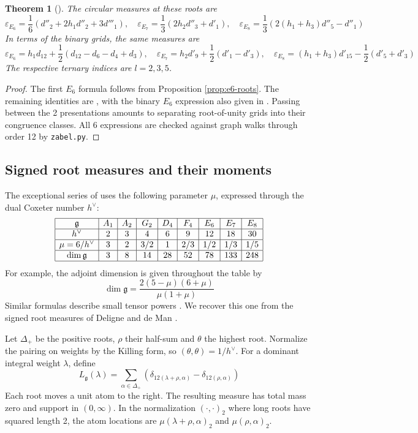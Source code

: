 \documentclass[11pt,reqno]{amsart}
\newtheorem{thm}{Theorem}[section]
\theoremstyle{definition}
\numberwithin{equation}{section}
\begin{document}
\begin{thm}[\cite{Ban09}]\label{thm:egrids}
The circular measures at these roots are
$$\varepsilon_{E_6}=\frac16(d''_2+2h_1d''_2+3d'''_1),\quad \varepsilon_{E_7}=\frac13(2h_2d''_3+d'_1),\quad \varepsilon_{E_8}=\frac13(2(h_1+h_3)d''_5-d''_1)$$
In terms of the binary grids, the same measures are
$$\varepsilon_{E_6}=h_1d_{12}+\frac12(d_{12}-d_6-d_4+d_3),\quad \varepsilon_{E_7}=h_2d'_9+\frac12(d'_1-d'_3),\quad \varepsilon_{E_8}=(h_1+h_3)d'_{15}-\frac12(d'_5+d'_3)$$
The respective ternary indices are $l=2,3,5$.
\end{thm}
\begin{proof}
The first $E_6$ formula follows from Proposition \ref{prop:e6-roots}. The remaining identities are \cite[Theorems 7.1 and 8.7]{Ban09}, with the binary $E_6$ expression also given in \cite[Theorem 6.2]{BB07}. Passing between the 2 presentations amounts to separating root-of-unity grids into their congruence classes. All 6 expressions are checked against graph walks through order 12 by \texttt{zabel.py}.
\end{proof}

\subsection{Signed root measures and their moments}

The exceptional series of \cite{Del96} uses the following parameter $\mu$, expressed through the dual Coxeter number $h^\vee$:
$$\begin{array}{|c|c|c|c|c|c|c|c|c|}\hline
\mathfrak g&A_1&A_2&G_2&D_4&F_4&E_6&E_7&E_8\\\hline
h^\vee&2&3&4&6&9&12&18&30\\\hline
\mu=6/h^\vee&3&2&3/2&1&2/3&1/2&1/3&1/5\\\hline
\dim\mathfrak g&3&8&14&28&52&78&133&248\\\hline
\end{array}$$
For example, the adjoint dimension is given throughout the table by
\begin{equation}\label{eq:deligne-dim}
\dim\mathfrak g=\frac{2(5-\mu)(6+\mu)}{\mu(1+\mu)}
\end{equation}
Similar formulas describe small tensor powers \cite{Del96,LM02}. We recover this one from the signed root measures of Deligne and de Man \cite{DDM96}.

Let $\Delta_+$ be the positive roots, $\rho$ their half-sum and $\theta$ the highest root. Normalize the pairing on weights by the Killing form, so $(\theta,\theta)=1/h^\vee$. For a dominant integral weight $\lambda$, define
$$L_{\mathfrak g}(\lambda)=\sum_{\alpha\in\Delta_+}(\delta_{12(\lambda+\rho,\alpha)}-\delta_{12(\rho,\alpha)})$$
Each root moves a unit atom to the right. The resulting measure has total mass zero and support in $(0,\infty)$. In the normalization $(\cdot,\cdot)_2$ where long roots have squared length 2, the atom locations are $\mu(\lambda+\rho,\alpha)_2$ and $\mu(\rho,\alpha)_2$.
\end{document}
